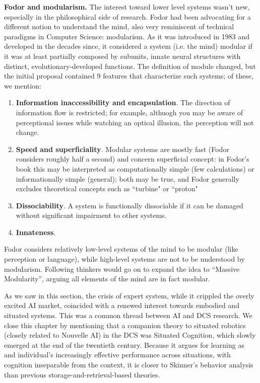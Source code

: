 \documentclass[../main.tex]{subfiles}
\begin{document}
\vspace{4pt}
\textbf{Fodor and modularism.} The interest toward lower level systems wasn't new, especially in the philosophical side of research. Fodor had been advocating for a different notion to understand the mind, also very reminiscent of technical paradigms in Computer Science: modularism. As it was introduced in 1983\cite{fodorModularityMind1983} and developed in the decades since, it considered a system (i.e. the mind) modular if it was at least partially composed by subunits, innate neural structures with distinct, evolutionary-developed functions. The definition of module changed, but the initial proposal contained 9 features that characterize such systems; of these, we mention:
\begin{enumerate}
    \item \textbf{Information inaccessibility and encapsulation}. The direction of information flow is restricted; for example, althuogh you may be aware of perceptional issues while watching an optical illusion, the perception will not change.
    \item \textbf{Speed and superficiality}. Modular systems are mostly fast (Fodor considers roughly half a second) and concern superficial concept: in Fodor's book this may be interpreted as computationally simple (few calculations) or informationally simple (general); both may be true, and Fodor generally excludes theoretical concepts such as ``turbine" or ``proton"
    \item \textbf{Dissociability}. A system is functionally dissociable if it can be damaged without significant impairment to other systems.
    \item \textbf{Innateness}.
\end{enumerate}
Fodor considers relatively low-level systems of the mind to be modular (like perception or language), while high-level systems are not to be understood by modularism. Following thinkers would go on to expand the idea to ``Massive Modularity'', arguing all elements of the mind are in fact modular.

\vspace{5pt}
As we saw in this section, the crisis of expert system, while it crippled the overly excited AI market, coincided with a renewed interest towards embodied and situated systems. This was a common thread between AI and DCS research. We close this chapter by mentioning that a companion theory to situated robotics (closely related to Nouvelle AI) in the DCS was Situated Cognition, which slowly emerged at the end of the twentieth century. Because it argues for learning as and individual's increasingly effective performance across situations, with cognition inseparable from the context, it is closer to Skinner's behavior analysis than previous storage-and-retrieval-based theories.
\end{document}
